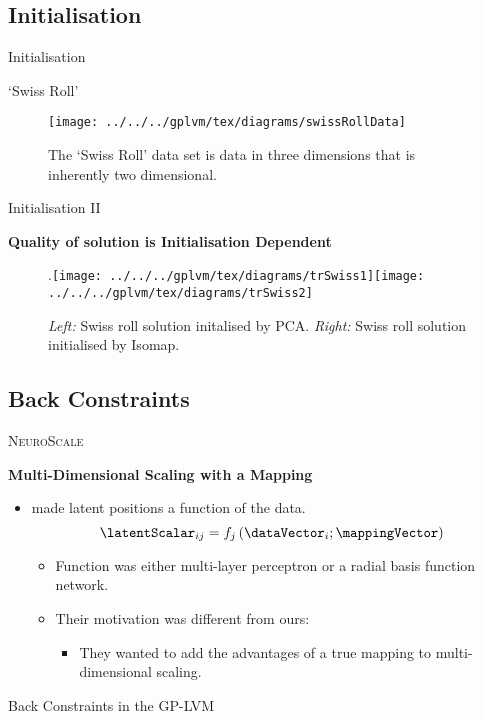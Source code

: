 \subsection{Initialisation}

Initialisation

`Swiss Roll'

%
\begin{figure}
\begin{centering}
\texttt{[image: ../../../gplvm/tex/diagrams/swissRollData]}
\par\end{centering}

\caption{The `Swiss Roll' data set is data in three dimensions that is inherently
two dimensional.}

\end{figure}


Initialisation II

\textbf{Quality of solution is Initialisation Dependent}

\begin{flushright}
%
\begin{figure}
.\texttt{[image: ../../../gplvm/tex/diagrams/trSwiss1]}\hfill{}\texttt{[image: ../../../gplvm/tex/diagrams/trSwiss2]}

\caption{\emph{Left:} Swiss roll solution initalised by PCA. \emph{Right:}
Swiss roll solution initialised by Isomap.}

\end{figure}

\par\end{flushright}


\subsection{Back Constraints}

\textsc{NeuroScale}

\textbf{Multi-Dimensional Scaling with a Mapping}
\begin{itemize}
\item \cite{Lowe:neuroscale96} made latent positions a function of the
data.\[
\latentScalar_{ij}=f_{j}\left(\dataVector_{i};\mappingVector\right)\]


\begin{itemize}
\item Function was either multi-layer perceptron or a radial basis function
network.
\item Their motivation was different from ours:

\begin{itemize}
\item They wanted to add the advantages of a true mapping to multi-dimensional
scaling.
\end{itemize}
\end{itemize}
\end{itemize}
Back Constraints in the GP-LVM

